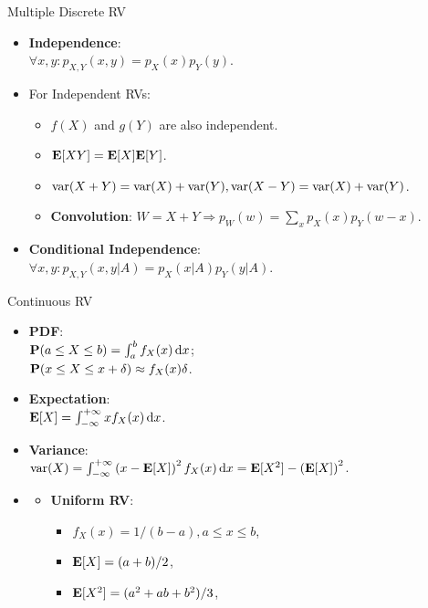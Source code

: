 \documentclass[landscape,a4paper]{article}
\begin{document}
\begin{cheatsheetcolumns}
\begin{card}{Multiple Discrete RV}
\begin{itemize}
\begin{itemize}
						\item \textbf{Marginal PMF}:\\ $p_{X,Y}(x,y)=\sum_z p_{X,Y,Z}(x,y,z);p_X(x)=\sum_y p_{X,Y}(x,y)$.
						\item \textbf{Derived RV}: $Z=g(X,Y)\Rightarrow p_Z(z)=\sum_{g(x,y)=z}p_{X,Y}(x,y)$.
					\end{itemize}
					\item \textbf{Independence}:\\ $\forall x,y\colon p_{X,Y}(x,y)=p_X(x)p_Y(y)$.
					\item For Independent RVs:
					\begin{itemize}
						\item $f(X)$ and $g(Y)$ are also independent.
						\item $\mathbf{E}[XY]=\mathbf{E}[X]\mathbf{E}[Y]$.
						\item $\operatorname{var}(X+Y)=\operatorname{var}(X)+\operatorname{var}(Y), \operatorname{var}(X-Y)=\operatorname{var}(X)+\operatorname{var}(Y)$.
						\item \textbf{Convolution}: $W=X+Y\Rightarrow p_W(w)=\sum_xp_X(x)p_Y(w-x)$.
					\end{itemize}
					\item \textbf{Conditional Independence}:\\ $\forall x,y\colon p_{X,Y}(x,y|A)=p_X(x|A)p_Y(y|A)$.
				\end{itemize}
		\end{card}
		\begin{card}{Continuous RV}
			\begin{itemize}
				\item \textbf{PDF}:\\ $\mathbf{P}(a\le X\le b)=\int_a^bf_X(x)\,\mathrm dx$;\\
				$\mathbf{P}(x\le X\le x+\delta)\approx f_X(x)\delta$.
				\item \textbf{Expectation}:\\ $\mathbf{E}[X]=\int_{-\infty}^{+\infty} xf_X(x)\,\mathrm dx$.
				\item \textbf{Variance}:\\ $\operatorname{var}(X)=\int_{-\infty}^{+\infty}\left(x-\mathbf{E}[X]\right)^2f_X(x)\,\mathrm dx=\mathbf{E}[X^2]-\left(\mathbf{E}[X]\right)^2$.
				\item \begin{itemize}
					\item \textbf{Uniform RV}:
					\begin{itemize}
						\item $f_X(x)=1/(b-a),a\le x\le b$,
						\item $\mathbf{E}[X]=(a+b)/2$,
						\item $\mathbf{E}[X^2]=(a^2+ab+b^2)/3$,

\end{itemize}
\end{itemize}
\end{itemize}
\end{card}
\end{cheatsheetcolumns}
\end{document}
